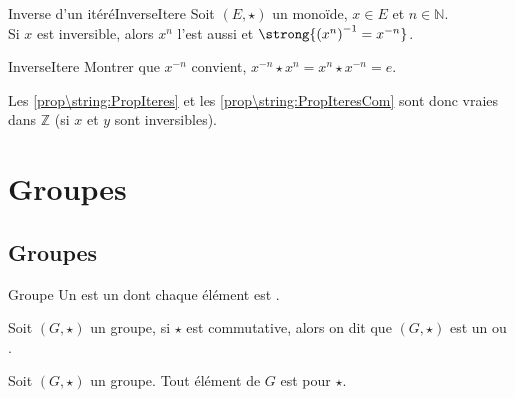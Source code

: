 \documentclass[12pt,a4paper]{report}
\begin{document}
    \begin{proposition}{Inverse d'un itéré}{InverseItere}
    Soit $(E, \star)$ un monoïde, $x \in E$ et $n \in \mathbb{N}$.\\
    Si $x$ est inversible, alors $x^n$ l'est aussi et $\strong{\left(x^n\right)^{-1} = x^{-n}}$.
    \end{proposition}
    
    \begin{principedemo}{InverseItere}
    Montrer que $x^{-n}$ convient, \ie $x^{-n} \star x^n = x^n \star x^{-n} = e$.
    \end{principedemo}
    
    \begin{remarque}
    Les \cref{prop\string:PropIteres}  et les \cref{prop\string:PropIteresCom}  sont donc vraies dans $\mathbb{Z}$ (si $x$ et $y$ sont inversibles).
    \end{remarque}
    
    
\section{Groupes}

    \subsection{Groupes}

    \begin{definition}{Groupe}{}
    Un  est un  dont chaque élément est .
    \end{definition}
    
    \begin{remarque}
    Soit $(G, \star)$ un groupe, si $\star$ est commutative, alors on dit que $(G, \star)$ est un  ou .
    \end{remarque}
    
    \begin{remarque} Soit $(G, \star)$ un groupe. Tout élément de $G$ est  pour $\star$.
    \end{remarque}
    
\end{document}
